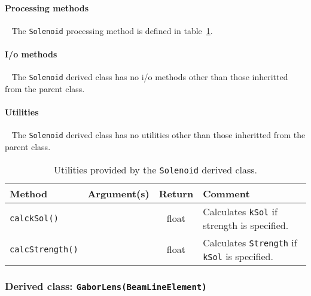 \paragraph{Processing methods} ~\newline
\noindent
The \texttt{Solenoid} processing method is defined in
table~\ref{Tab:Slnd:Methods}.

\paragraph{I/o methods} ~\newline
\noindent
The \texttt{Solenoid} derived class has no i/o methods other
than those inheritted from the parent class.

\paragraph{Utilities} ~\newline
\noindent
The \texttt{Solenoid} derived class has no utilities other
than those inheritted from the parent class. 

\begin{table}[h]
  \caption{
    Utilities provided by the \texttt{Solenoid} derived
    class. 
  }
  \label{Tab:Slnd:Methods}
  \begin{center}
    \begin{tabular}{|l|c|c|p{7cm}|}
      \hline
      \textbf{Method} & \textbf{Argument(s)} & \textbf{Return} & \textbf{Comment}                      \\
      \hline
      \texttt{calckSol()}     &  & float & Calculates \texttt{kSol} if strength is specified.          \\
      \texttt{calcStrength()} &  & float & Calculates \texttt{Strength} if \texttt{kSol} is specified. \\
      \hline
    \end{tabular}
  \end{center}
\end{table}

\FloatBarrier

\subsubsection{Derived class: \texttt{GaborLens(BeamLineElement)}}

